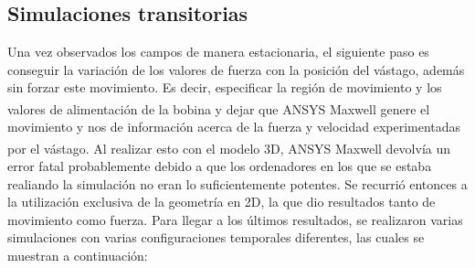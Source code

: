 \subsection{Simulaciones transitorias}
Una vez observados los campos de manera estacionaria, el siguiente paso es conseguir la variación de los valores de fuerza con la posición del vástago, además sin forzar este movimiento. Es decir, especificar la región de movimiento y los valores de alimentación de la bobina y dejar que ANSYS Maxwell\textsuperscript{\textregistered} genere el movimiento y nos de información acerca de la fuerza y velocidad experimentadas por el vástago. Al realizar esto con el modelo 3D, ANSYS Maxwell\textsuperscript{\textregistered} devolvía un error fatal probablemente debido a que los ordenadores en los que se estaba realiando la simulación no eran lo suficientemente potentes. Se recurrió entonces a la utilización exclusiva de la geometría en 2D, la que dio resultados tanto de movimiento como fuerza. Para llegar a los últimos resultados, se realizaron varias simulaciones con varias configuraciones temporales diferentes, las cuales se muestran a continuación:
